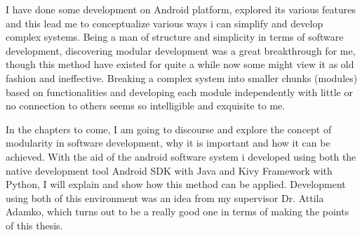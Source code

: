 I have done some development on Android platform, explored its various features and this lead me to conceptualize various ways i can simplify and develop complex systems. Being a man of structure and simplicity in terms of software development, discovering modular development was a great breakthrough for me, though this method have existed for quite a while now some might view it as old fashion and ineffective. Breaking a complex system into smaller chunks (modules) based on functionalities and developing each module independently with little or no connection to others seems so intelligible and exquisite to me.


In the chapters to come, I am going to discourse and explore the concept of modularity in software development, why it is important and how it can be achieved. With the aid of the android software system i developed using both the native development tool Android SDK with Java and Kivy Framework with Python, I will explain and show how this method can be applied. Development using both of this environment was an idea from my supervisor Dr. Attila Adamko, which turns out to be a really good one in terms of making the points of this thesis.
